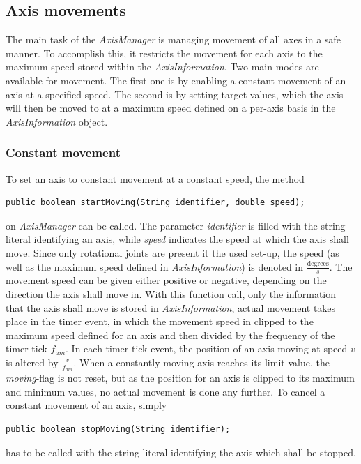 \subsection{Axis movements}
\label{sec:impl:axismovements}

The main task of the \textit{AxisManager} is managing movement of all axes in a safe manner. To accomplish this, it restricts the movement for each axis to the maximum speed stored within the \textit{AxisInformation}. Two main modes are available for movement. The first one is by enabling a constant movement of an axis at a specified speed. The second is by setting target values, which the axis will then be moved to at a maximum speed defined on a per-axis basis in the \textit{AxisInformation} object.

\subsubsection{Constant movement}

To set an axis to constant movement at a constant speed, the method
\begin{lstlisting}
public boolean startMoving(String identifier, double speed);
\end{lstlisting}
on \textit{AxisManager} can be called. The parameter \textit{identifier} is filled with the string literal identifying an axis, while \textit{speed} indicates the speed at which the axis shall move. Since only rotational joints are present it the used set-up, the speed (as well as the maximum speed defined in \textit{AxisInformation}) is denoted in $\frac{\text{degrees}}{s}$. The movement speed can be given either positive or negative, depending on the direction the axis shall move in. With this function call, only the information that the axis shall move is stored in \textit{AxisInformation}, actual movement takes place in the timer event, in which the movement speed in clipped to the maximum speed defined for an axis and then divided by the frequency of the timer tick $f_{am}$. In each timer tick event, the position of an axis moving at speed $v$ is altered by $\frac{v}{f_{am}}$. When a constantly moving axis reaches its limit value, the \textit{moving}-flag is not reset, but as the position for an axis is clipped to its maximum and minimum values, no actual movement is done any further. To cancel a constant movement of an axis, simply
\begin{lstlisting}
public boolean stopMoving(String identifier);
\end{lstlisting}
has to be called with the string literal identifying the axis which shall be stopped.

